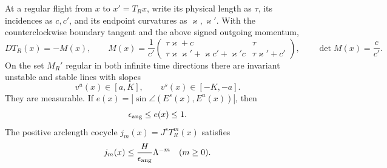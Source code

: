 \begin{lemma}
\label{lem:eo-differential}
At a regular flight from $x$ to $x'=T_Rx$, write its physical
length as $\tau$, its incidences as $c,c'$, and its endpoint
curvatures as $\varkappa,\varkappa'$.  With the counterclockwise
boundary tangent and the above signed outgoing momentum,
\begin{equation}\label{eq:eo-one-flight}
 D T_R(x)=-M(x),\qquad
 M(x)=\frac1{c'}
 \begin{pmatrix}
   \tau\varkappa+c&\tau\\
   \tau\varkappa\varkappa'+\varkappa c'
          +\varkappa'c&\tau\varkappa'+c'
 \end{pmatrix},\qquad
 \det M(x)=\frac c{c'}.
\end{equation}
On the set $M_R'$ regular in both infinite time directions there
are invariant unstable and stable lines with slopes
\[
             v^u(x)\in[a,K],\qquad v^s(x)\in[-K,-a].
\]
They are measurable.  If
$e(x)=|\sin\angle(E^s(x),E^u(x))|$, then
\begin{equation}\label{eq:eo-angle}
                    \epsilon_{\rm ang}\le e(x)\le1.
\end{equation}
The positive arclength cocycle $j_m(x)=J^sT_R^m(x)$ satisfies
\begin{equation}\label{eq:eo-stable-decay}
             j_m(x)\le\frac{H}{\epsilon_{\rm ang}}\Lambda^{-m}
                         \quad(m\ge0).
\end{equation}
\end{lemma}

